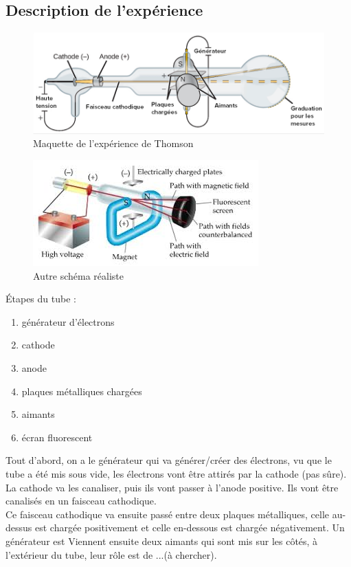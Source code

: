 \documentclass[../main.tex]{subfiles}
\begin{document}
\subsection{Description de l'expérience}
\begin{figure}[h!]
    \centering
    \includegraphics[scale=0.7]{images/02.JJ-Thomson.png}
    \caption{Maquette de l'expérience de Thomson}
    \label{fig:my_label}
\end{figure}
\begin{figure}[h!]
    \centering
    \includegraphics[scale=0.9]{images/08.JJ-Thomson..jpg}
    \caption{Autre schéma réaliste}
    \label{fig:my_label}
\end{figure}
Étapes du tube : \\
\begin{enumerate}
    \item générateur d'électrons
    \item cathode
    \item anode
    \item plaques métalliques chargées
    \item aimants
    \item écran fluorescent
\end{enumerate}
Tout d'abord, on a le générateur qui va générer/créer des électrons, vu que le tube a été mis sous vide, les électrons vont être attirés par la cathode (pas sûre). La cathode va les canaliser, puis ils vont passer à l'anode positive. Ils vont être canalisés en un faisceau cathodique.\\
Ce faisceau cathodique va ensuite passé entre deux plaques métalliques, celle au-dessus est chargée positivement et celle en-dessous est chargée négativement. Un générateur est Viennent ensuite deux aimants qui sont mis sur les côtés, à l'extérieur du tube, leur rôle est de ...(à chercher).\\
\end{document}
